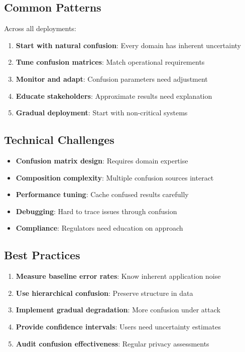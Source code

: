 \documentclass[11pt,final]{article}
\begin{document}
\subsection{Common Patterns}

Across all deployments:
\begin{enumerate}
    \item \textbf{Start with natural confusion}: Every domain has inherent uncertainty
    \item \textbf{Tune confusion matrices}: Match operational requirements
    \item \textbf{Monitor and adapt}: Confusion parameters need adjustment
    \item \textbf{Educate stakeholders}: Approximate results need explanation
    \item \textbf{Gradual deployment}: Start with non-critical systems
\end{enumerate}

\subsection{Technical Challenges}

\begin{itemize}
    \item \textbf{Confusion matrix design}: Requires domain expertise
    \item \textbf{Composition complexity}: Multiple confusion sources interact
    \item \textbf{Performance tuning}: Cache confused results carefully
    \item \textbf{Debugging}: Hard to trace issues through confusion
    \item \textbf{Compliance}: Regulators need education on approach
\end{itemize}

\subsection{Best Practices}

\begin{enumerate}
    \item \textbf{Measure baseline error rates}: Know inherent application noise
    \item \textbf{Use hierarchical confusion}: Preserve structure in data
    \item \textbf{Implement gradual degradation}: More confusion under attack
    \item \textbf{Provide confidence intervals}: Users need uncertainty estimates
    \item \textbf{Audit confusion effectiveness}: Regular privacy assessments
\end{enumerate}
\end{document}
